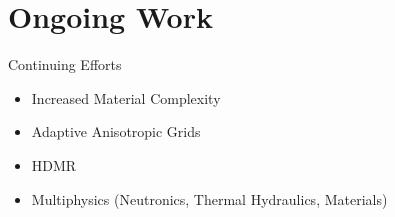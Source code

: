\documentclass{beamer}
\begin{document}
\section{Ongoing Work}
\begin{frame}{Continuing Efforts}\vspace{-50pt}
\begin{itemize}
\item Increased Material Complexity
\item Adaptive  Anisotropic Grids
\item HDMR
\item Multiphysics (Neutronics, Thermal Hydraulics, Materials)
\end{itemize}
\end{frame}

\section{}
\begin{frame}{}

\end{frame}

%
\end{document}
